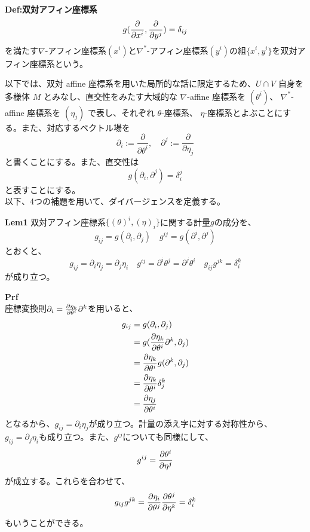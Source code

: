 \documentclass[a4paper,11pt]{jsarticle}
\numberwithin{equation}{section}
\begin{document}
\begin{itembox}[l]{\textbf{Def:双対アフィン座標系}}
    \begin{equation}
        g(\pdv{x^i},\pdv{y^j}) = \delta_{ij}
    \end{equation}
    を満たす$\nabla$-アフィン座標系$(x^i)$と$\nabla^*$-アフィン座標系$(y^i)$の組$\{x^i,y^i\}$を双対アフィン座標系という。
\end{itembox}

以下では、双対 affine 座標系を用いた局所的な話に限定するため、\( U \cap V \) 自身を多様体 \( M \) とみなし、直交性をみたす大域的な \( \nabla \)-affine 座標系を \((\theta^i)\)、 \( \nabla^*\)-affine 座標系を \((\eta_j)\) で表し、それぞれ \(\theta\)-座標系、 \(\eta\)-座標系とよぶことにする。また、対応するベクトル場を
\begin{equation}
\partial_i := \frac{\partial}{\partial \theta^i}, \quad \partial^j := \frac{\partial}{\partial \eta_j} \tag{4.40}
\end{equation}
と書くことにする。また、直交性は
\begin{equation}
g(\partial_i, \partial^j) = \delta_i^j 
\end{equation}
と表すことにする。\\
以下、4つの補題を用いて、ダイバージェンスを定義する。

\begin{itembox}[l]{\textbf{Lem1}}
    双対アフィン座標系$\{(\theta)^i,(\eta)_i\}$に関する計量$g$の成分を、
    \begin{equation}
        g_{ij} = g(\partial_i,\partial_j) \quad g^{ij} = g(\partial^i,\partial^j)
    \end{equation}
    とおくと、
    \begin{equation}
        g_{ij} = \partial_i \eta_j = \partial_j \eta_i \quad g^{ij} = \partial^i \theta^j = \partial^j \theta^i \quad g_{ij}g^{jk} = \delta_i^k
    \end{equation}
    が成り立つ。
\end{itembox}
\textbf{Prf}\\
座標変換則$\partial_i = \pdv{\eta_k}{\theta^i}\partial^k$を用いると、
\begin{align}
    g_{ij} &= g(\partial_i,\partial_j) \\
    &= g(\pdv{\eta_k}{\theta^i}\partial^k,\partial_j) \\
    &= \pdv{\eta_k}{\theta^i}g(\partial^k,\partial_j) \\
    &= \pdv{\eta_k}{\theta^i}\delta_j^k \\
    &= \pdv{\eta_j}{\theta^i}
\end{align}
となるから、$g_{ij} = \partial_i \eta_j$が成り立つ。計量の添え字に対する対称性から、$g_{ij} = \partial_j \eta_i$も成り立つ。また、$g^{ij}$についても同様にして、
\begin{align}
    g^{ij} = \pdv{\theta ^i}{\eta^j}
\end{align}
が成立する。これらを合わせて、
\begin{align}
    g_{ij}g^{jk} = \pdv{\eta_i}{\theta^j}\pdv{\theta^j}{\eta^k} = \delta_i^k
\end{align}
もいうことができる。\hfill\qedsymbol
\end{document}
